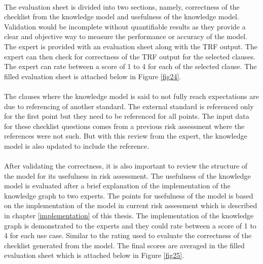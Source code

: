 
\bigskip {}

\paragraph{} The evaluation sheet is divided into two sections, namely, correctness of the checklist from the knowledge model and usefulness of the knowledge model. Validation would be incomplete without quantifiable results as they provide a clear and objective way to measure the performance or accuracy of the model. The expert is provided with an evaluation sheet along with the TRF output. The expert can then check for correctness of the TRF output for the selected clauses. The expert can rate between a score of 1 to 4 for each of the selected clause. The filled evaluation sheet is attached below in Figure \ref{fig24}.

\bigskip {}

\paragraph{} The clauses where the knowledge model is said to not fully reach expectations are due to referencing of another standard. The external standard is referenced only for the first point but they need to be referenced for all points. The input data for these checklist questions comes from a previous risk assessment where the references were not such. But with this review from the expert, the knowledge model is also updated to include the reference. 

\paragraph{} After validating the correctness, it is also important to review the structure of the model for its usefulness in risk assessment. The usefulness of the knowledge model is evaluated after a brief explanation of the implementation of the knowledge graph to two experts. The points for usefulness of the model is based on the implementation of the model in current risk assessment which is described in chapter \ref{implementation} of this thesis. The implementation of the knowledge graph is demonstrated to the experts and they could rate between a score of 1 to 4 for each use case. Similar to the rating used to evaluate the correctness of the checklist generated from the model. The final scores are averaged in the filled evaluation sheet which is attached below in Figure \ref{fig25}.


\bigskip\bigskip {}